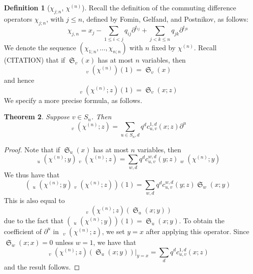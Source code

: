 \documentclass{amsart}
\newtheorem{lemma}{Lemma}[section]
\newtheorem{theorem}[lemma]{Theorem}
\theoremstyle{definition}
\newtheorem{definition}[lemma]{Definition}
\theoremstyle{remark}
\numberwithin{equation}{section}
\DeclareMathOperator{\sch}{\mathfrak{S}}
\DeclareMathOperator{\qsch}{\widetilde{\mathfrak{S}}}
\begin{document}




\begin{definition}[$\chi_{j;n}$, $\chi^{(n)}$]
Recall the definition of the commuting difference operators $\chi_{j;n}$, with $j\leq n$, defined by Fomin, Gelfand, and Postnikov, as follows:
$$\chi_{j,n}=x_j-\sum_{1\leq i<j}q_{ij}\partial^{t_{ij}}+\sum_{j<k\leq n} q_{jk}\partial^{t_{jk}}$$
We denote the sequence $(\chi_{1;n},\ldots,\chi_{n;n})$ with $n$ fixed by $\chi^{(n)}$. Recall (CITATION) that if $\sch_v(x)$ has at most $n$ variables, then
$$\qsch_v(\chi^{(n)})(1) = \sch_v(x)$$
and hence
$$\qsch_v(\chi^{(n)};z)(1) = \sch_v(x;z)$$
We specify a more precise formula, as follows.
\end{definition}

\begin{theorem}
Suppose $v\in S_n$. Then
$$\qsch_v(\chi^{(n)};z)=\sum_{u\in S_{n},d} q^dc_{u,v}^{1,d}(x;z)\partial^u$$
\end{theorem}
\begin{proof}
Note that if $\sch_u(x)$ has at most $n$ variables, then
$$\qsch_u(\chi^{(n)};y)\qsch_v(\chi^{(n)};z)=\sum_{w,d} q^dc_{u,v}^{w,d}(y;z)\qsch_w(\chi^{(n)};y)$$
We thus have that
$$(\qsch_u(\chi^{(n)};y)\qsch_v(\chi^{(n)};z))(1)=\sum_{w,d} q^dc_{u,v}^{w,d}(y;z)\sch_w(x;y)$$
This is also equal to
$$\qsch_v(\chi^{(n)};z)(\sch_u(x;y))$$
due to the fact that $(\qsch_u(\chi^{(n)};y))(1)=\sch_u(x;y)$. To obtain the coefficient of $\partial^u$ in $\qsch_v(\chi^{(n)};z)$, we set $y=x$ after applying this operator. Since $\sch_w(x;x)=0$ unless $w=1$, we have that
$$\qsch_v(\chi^{(n)};z)(\sch_u(x;y))|_{y=x}=\sum_d q^dc_{u,v}^{1,d}(x;z)$$
and the result follows.
\end{proof}

\end{document}
